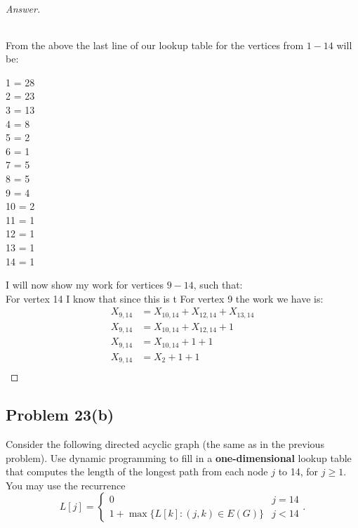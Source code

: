 \documentclass[11pt]{article}
\theoremstyle{definition}
\theoremstyle{definition}
\theoremstyle{definition}
\begin{document}
\begin{proof}[Answer]
\begin{center}
{\begin{tabular}{ | c | c | c | c | c | c | c | c | c | c | c | c | c | c | c |}
    \hline
\end{tabular}
}
\end{center}
From the above the last line of our lookup table for the vertices from $1-14$ will be: \\
\begin{center}
1 = 28 \\
2 = 23 \\
3 = 13 \\
4 = 8 \\
5 = 2 \\
6 = 1 \\
7 = 5 \\
8 = 5 \\
9 = 4 \\
10 = 2 \\
11 = 1 \\
12 = 1 \\
13 = 1 \\
14 = 1 \\
\end{center}
I will now show my work for vertices $9 - 14$, such that:\\
For vertex 14 I know that since this is t
For vertex 9 the work we have is: \\
\begin{align*}
X_{9, 14} &= X_{10, 14} + X_{12, 14} + X_{13, 14} \\
X_{9, 14} &= X_{10, 14} + X_{12, 14} + 1 \\
X_{9, 14} &= X_{10, 14} + 1 + 1 \\
X_{9, 14} &= X_2 + 1 + 1 \\
\end{align*}
\end{proof}

\newpage
\subsection{Problem 23(b)}

Consider the following directed acyclic graph (the same as in the previous problem). Use dynamic programming to fill in a \textbf{one-dimensional} lookup table that computes the length of the longest path from each node $j$ to 14, for $j \geq 1$. You may use the recurrence
\[
L[j] = \begin{cases}
0 & j = 14 \\
1 + \max\{L[k] : (j,k) \in E(G)\} & j < 14
\end{cases}.
\]
\end{document}
